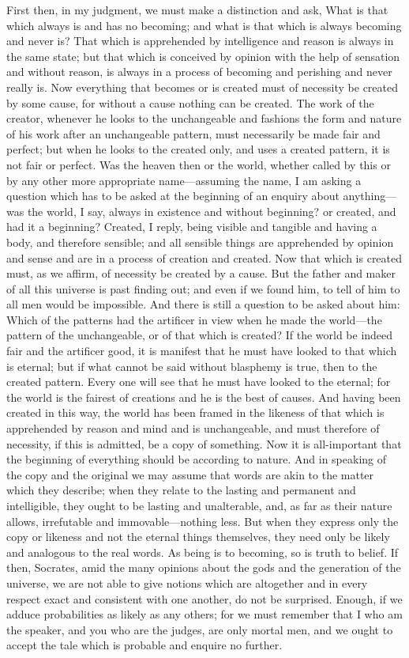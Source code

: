 First then, in my judgment, we must make a distinction and ask, What is
that which always is and has no becoming; and what is that which is always
becoming and never is? That which is apprehended by intelligence and
reason is always in the same state; but that which is conceived by opinion
with the help of sensation and without reason, is always in a process of
becoming and perishing and never really is. Now everything that becomes or
is created must of necessity be created by some cause, for without a cause
nothing can be created. The work of the creator, whenever he looks to the
unchangeable and fashions the form and nature of his work after an
unchangeable pattern, must necessarily be made fair and perfect; but when
he looks to the created only, and uses a created pattern, it is not fair
or perfect. Was the heaven then or the world, whether called by this or by
any other more appropriate name—assuming the name, I am asking a
question which has to be asked at the beginning of an enquiry about
anything—was the world, I say, always in existence and without
beginning? or created, and had it a beginning? Created, I reply, being
visible and tangible and having a body, and therefore sensible; and all
sensible things are apprehended by opinion and sense and are in a process
of creation and created. Now that which is created must, as we affirm, of
necessity be created by a cause. But the father and maker of all this
universe is past finding out; and even if we found him, to tell of him to
all men would be impossible. And there is still a question to be asked
about him: Which of the patterns had the artificer in view when he made
the world—the pattern of the unchangeable, or of that which is
created? If the world be indeed fair and the artificer good, it is
manifest that he must have looked to that which is eternal; but if what
cannot be said without blasphemy is true, then to the created pattern.
Every one will see that he must have looked to the eternal; for the world
is the fairest of creations and he is the best of causes. And having been
created in this way, the world has been framed in the likeness of that
which is apprehended by reason and mind and is unchangeable, and must
therefore of necessity, if this is admitted, be a copy of something. Now
it is all-important that the beginning of everything should be according
to nature. And in speaking of the copy and the original we may assume that
words are akin to the matter which they describe; when they relate to the
lasting and permanent and intelligible, they ought to be lasting and
unalterable, and, as far as their nature allows, irrefutable and immovable—nothing
less. But when they express only the copy or likeness and not the eternal
things themselves, they need only be likely and analogous to the real
words. As being is to becoming, so is truth to belief. If then, Socrates,
amid the many opinions about the gods and the generation of the universe,
we are not able to give notions which are altogether and in every respect
exact and consistent with one another, do not be surprised. Enough, if we
adduce probabilities as likely as any others; for we must remember that I
who am the speaker, and you who are the judges, are only mortal men, and
we ought to accept the tale which is probable and enquire no further.

